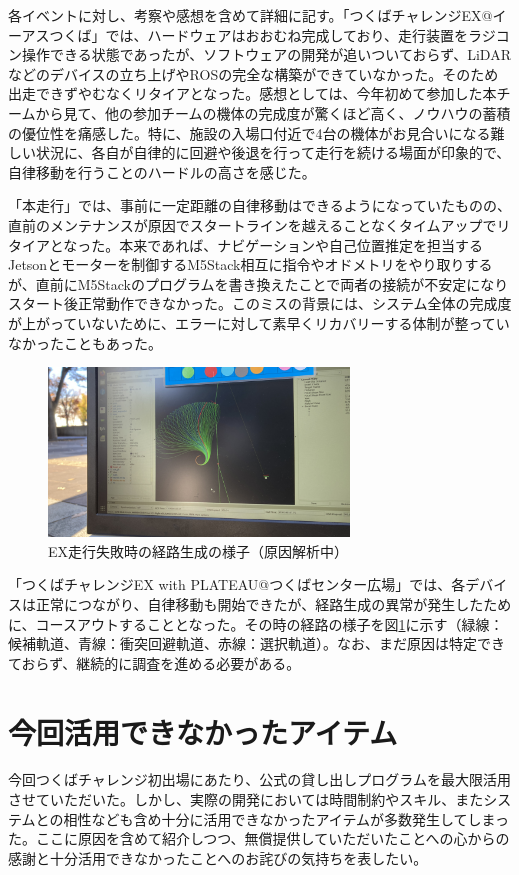 \documentclass[platex,dvipdfmx]{rbproceedings}
\begin{document}
各イベントに対し、考察や感想を含めて詳細に記す。「つくばチャレンジEX@イーアスつくば」では、ハードウェアはおおむね完成しており、走行装置をラジコン操作できる状態であったが、ソフトウェアの開発が追いついておらず、LiDARなどのデバイスの立ち上げやROSの完全な構築ができていなかった。そのため出走できずやむなくリタイアとなった。感想としては、今年初めて参加した本チームから見て、他の参加チームの機体の完成度が驚くほど高く、ノウハウの蓄積の優位性を痛感した。特に、施設の入場口付近で4台の機体がお見合いになる難しい状況に、各自が自律的に回避や後退を行って走行を続ける場面が印象的で、自律移動を行うことのハードルの高さを感じた。

「本走行」では、事前に一定距離の自律移動はできるようになっていたものの、直前のメンテナンスが原因でスタートラインを越えることなくタイムアップでリタイアとなった。本来であれば、ナビゲーションや自己位置推定を担当するJetsonとモーターを制御するM5Stack相互に指令やオドメトリをやり取りするが、直前にM5Stackのプログラムを書き換えたことで両者の接続が不安定になりスタート後正常動作できなかった。このミスの背景には、システム全体の完成度が上がっていないために、エラーに対して素早くリカバリーする体制が整っていなかったこともあった。

\begin{figure}[h]
  \centering
  \includegraphics[width=80mm]{./picture/guruguru_path_plan.jpg}
    \caption{EX走行失敗時の経路生成の様子（原因解析中）}
  \label{fig:guruguru_path}%
\end{figure}

「つくばチャレンジEX with PLATEAU@つくばセンター広場」では、各デバイスは正常につながり、自律移動も開始できたが、経路生成の異常が発生したために、コースアウトすることとなった。その時の経路の様子を図\ref{fig:guruguru_path}に示す（緑線：候補軌道、青線：衝突回避軌道、赤線：選択軌道）。なお、まだ原因は特定できておらず、継続的に調査を進める必要がある。

\section{今回活用できなかったアイテム}
今回つくばチャレンジ初出場にあたり、公式の貸し出しプログラムを最大限活用させていただいた。しかし、実際の開発においては時間制約やスキル、またシステムとの相性なども含め十分に活用できなかったアイテムが多数発生してしまった。ここに原因を含めて紹介しつつ、無償提供していただいたことへの心からの感謝と十分活用できなかったことへのお詫びの気持ちを表したい。
\end{document}
